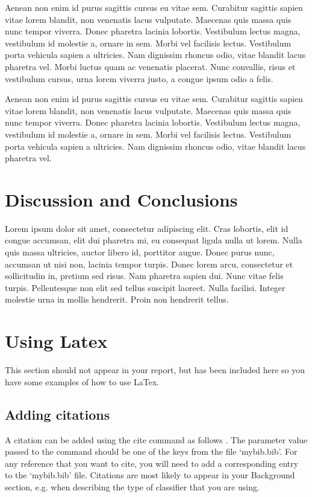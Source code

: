 \documentclass[a4paper]{article}
\begin{document}
Aenean non enim id purus sagittis cursus eu vitae sem. Curabitur sagittis sapien vitae lorem blandit, non venenatis lacus vulputate. Maecenas quis massa quis nunc tempor viverra. Donec pharetra lacinia lobortis. Vestibulum lectus magna, vestibulum id molestie a, ornare in sem. Morbi vel facilisis lectus. Vestibulum porta vehicula sapien a ultricies. Nam dignissim rhoncus odio, vitae blandit lacus pharetra vel. Morbi luctus quam ac venenatis placerat. Nunc convallis, risus et vestibulum cursus, urna lorem viverra justo, a congue ipsum odio a felis.

Aenean non enim id purus sagittis cursus eu vitae sem. Curabitur sagittis sapien vitae lorem blandit, non venenatis lacus vulputate. Maecenas quis massa quis nunc tempor viverra. Donec pharetra lacinia lobortis. Vestibulum lectus magna, vestibulum id molestie a, ornare in sem. Morbi vel facilisis lectus. Vestibulum porta vehicula sapien a ultricies. Nam dignissim rhoncus odio, vitae blandit lacus pharetra vel. 

\section{Discussion and Conclusions}


Lorem ipsum dolor sit amet, consectetur adipiscing elit. Cras lobortis, elit id congue accumsan, elit dui pharetra mi, eu consequat ligula nulla ut lorem. Nulla quis massa ultricies, auctor libero id, porttitor augue. Donec purus nunc, accumsan ut nisi non, lacinia tempor turpis. Donec lorem arcu, consectetur et sollicitudin in, pretium sed risus. Nam pharetra sapien dui. Nunc vitae felis turpis. Pellentesque non elit sed tellus suscipit laoreet. Nulla facilisi. Integer molestie urna in mollis hendrerit. Proin non hendrerit tellus.


\section{Using Latex}

This section should not appear in your report, but has been included here so you have some examples of how to use LaTex.

\subsection{Adding citations}
A citation can be added using the cite command as follows \cite{Davis80-COP}. The parameter value passed to the command should be one of the keys from the file `mybib.bib'. For any reference that you want to cite, you will need to add a corresponding entry to the `mybib.bib' file. Citations are most likely to appear in your Background section, e.g. when describing the type of classifier that you are using.
\end{document}
